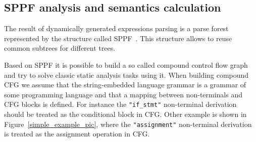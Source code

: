 \subsection{SPPF analysis and semantics calculation}

The result of dynamically generated expressions parsing is a parse forest represented by the structure called SPPF~\cite{SPPF:ref}. This structure allows to reuse common subtrees for different trees.

Based on SPPF it is possible to build a so called compound control flow graph and try to solve classic static analysis tasks using it. When building compound CFG we assume that the string-embedded language grammar is a grammar of some programming language and that a mapping between non-terminals and CFG blocks is defined. For instance the \verb|"if_stmt"| non-terminal derivation should be treated as the conditional block in CFG. Other example is shown in Figure~\ref{simple_example_pic}, where the \verb|"assignment"| non-terminal derivation is treated as the assignment operation in CFG.

